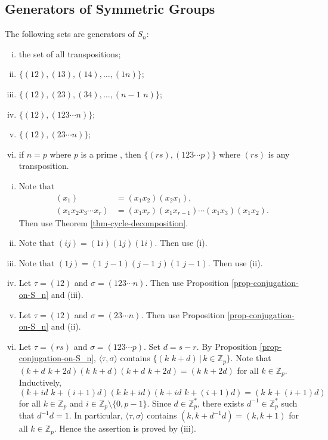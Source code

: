 \subsection{Generators of Symmetric Groups}
\begin{proposition}
The following sets are generators of $S_n$:
	\begin{enumerate}[(i)] 
		\item the set of all transpositions;
		\item $\{(12),(13),(14),\dots,(1n)\}$;
		\item $\{(12),(23),(34),\dots, (n-1\,\, n)\}$;
		\item $\{(12),(123\cdots n)\}$;
		\item $\{(12),(23\cdots n)\}$;
		\item  if $n=p$ where $p$ is a prime , then $\{(rs),(123\cdots p)\}$ where $(rs)$ is any transposition.
	\end{enumerate}
\end{proposition}
\begin{sketch}
	\begin{enumerate}[(i)]
		\item Note that 
		\begin{align*}
			(x_1) &= (x_1x_2)(x_2x_1),
			\\
			(x_1x_2x_3\cdots x_r) &= (x_1x_r)(x_1x_{r-1})\cdots (x_1x_3)(x_1x_2).
		\end{align*} Then use Theorem \ref{thm-cycle-decomposition}.
		\item Note that $(ij) = (1i)(1j)(1i)$. Then use (i).
		\item Note that $(1j) = (1\,\, j-1)(j-1\,\, j)(1\,\, j-1)$. Then use (ii).
		\item Let $\tau = (12)$ and $\sigma = (123\cdots n)$. Then use Proposition \ref{prop-conjugation-on-S_n} and (iii).
		\item Let $\tau = (12)$ and $\sigma = (23\cdots n)$. Then use Proposition \ref{prop-conjugation-on-S_n} and (ii).
		\item Let $\tau = (rs)$ and $\sigma = (123\cdots p)$. Set $d = s-r$. By Proposition \ref{prop-conjugation-on-S_n}, $\langle \tau,  \sigma\rangle$ contains $\{(k\,\, k+d)\,|\,k\in\mathbb{Z}_p\}$.  Note that $(k+d\,\, k+2d)(k\,\, k+d)(k+d\,\, k+2d) = (k\,\, k+2d)$ for all $k\in \mathbb{Z}_p$. Inductively, $(k+id\,\, k+(i+1)d)(k\,\, k+id)(k+id\,\, k+(i+1)d) = (k\,\, k+(i+1)d)$ for all $k\in\mathbb{Z}_p$ and $i\in \mathbb{Z}_p\setminus\{0,p-1\}$. Since $d\in \mathbb{Z}_p^*$, there exists $d^{-1}\in \mathbb{Z}_p^*$ such that $d^{-1}d = 1$. In particular, $\langle \tau,  \sigma\rangle$ contains $(k,k+d^{-1}d) = (k,k+1)$ for all $k\in\mathbb{Z}_p$. Hence the assertion is proved by (iii). \qedhere
	\end{enumerate}
\end{sketch}

